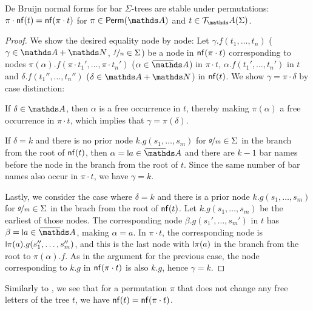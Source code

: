 \documentclass[a4paper,UKenglish,cleveref,autoref,thm-restate,numberwithinsect,final]{lipics-v2021}
\begin{document}
  \begin{lemma}\label{lem:TnfstPP}
        De Bruijn normal forms for bar $\Sigma$-trees are stable under permutations: $\pi \cdot \mathsf{nf}(t)
        = \mathsf{nf}(\pi \cdot t)$ for $\pi \in \Perm(\names)$ and $t \in \tree_\names(\Sigma)$.
    \end{lemma}
    \begin{proof}
        We show the desired equality node by node: Let $\gamma.f(t_1, \dots, t_n)$ ($\gamma \in \names + \Nat$,
        $\nicefrac{f}{n} \in \Sigma$) be a node in $\mathsf{nf}(\pi \cdot t)$ corresponding to nodes
        $\pi(\alpha).f(\pi\cdot t_1', \dots, \pi \cdot t_n')$ ($\alpha \in \barNames$) in $\pi \cdot t$,
        $\alpha.f(t_1',\dots,t_n')$ in $t$ and $\delta.f(t_1'',\dots,t_n'')$ ($\delta \in \names + \Nat$) in $\mathsf{nf}(t)$.
        We show $\gamma = \pi \cdot \delta$ by case distinction:

        If $\delta \in \names$, then $\alpha$ is a free occurrence in $t$, thereby making
        $\pi(\alpha)$ a free occurrence in $\pi \cdot t$, which implies that $\gamma = \pi(\delta)$.

        If $\delta = k$ and there is no prior node $k.g(s_1, \dots, s_m)$ for
        $\nicefrac{g}{m} \in \Sigma$ in the branch from the root of $\mathsf{nf}(t)$, then
        $\alpha = \newletter{a} \in \barNames$ and there are $k - 1$ bar names before the node
        in the branch from the root of $t$. Since the same number of bar names also occur in
        $\pi \cdot t$, we have $\gamma = k$.

        Lastly, we consider the case where $\delta = k$ and there is a prior node
        $k.g(s_1, \dots, s_m)$ for $\nicefrac{g}{m} \in \Sigma$ in the brach from the
        root of $\mathsf{nf}(t)$. Let $k.g(s_1, \dots, s_m)$ be the earliest of those nodes. The
        corresponding node $\beta.g(s_1', \dots, s_m')$ in $t$ has
        $\beta = \newletter{a} \in \barNames$, making $\alpha = a$. In $\pi \cdot t$, the
        corresponding node is $\newletter{\pi(a)}.g(s_1'', \dots, s_m'')$, and this is the last
        node with $\newletter{\pi(a)}$ in the branch from the root to $\pi(\alpha).f$.  As in
        the argument for the previous case, the node corresponding to $k.g$ in
        $\mathsf{nf}(\pi\cdot t)$ is also $k.g$, hence $\gamma = k$.
    \end{proof}
    \begin{rem}\label{R:pi.t}
      Similarly to , we see that for a permutation $\pi$ that does not change any
      free letters of the tree $t$, we have $\mathsf{nf}(t) = \mathsf{nf}(\pi\cdot t)$.
    \end{rem}
\end{document}
